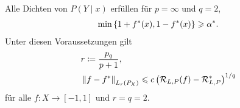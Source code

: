 \begin{bsp*}
Alle Dichten von $P(Y\mid x)$ erfüllen für $p=\infty$ und $q=2$,
\begin{align*}
\min\left\{ 1+f^*(x),1-f^*(x) \right\} \geqslant \alpha^*.
\end{align*}
Unter diesen Voraussetzungen gilt
\begin{align*}
&r \coloneq \frac{p_q}{p+1},\\
&\left\|f-f^*\right\|_{L_r(P_X)}
\leqslant c\left(\mathcal{R}_{L,P}(f)-\mathcal{R}_{L,P}^* \right)^{1/q}
\end{align*}
für alle $f: X\to [-1,1]$ und $r=q=2$.\bsphere
\end{bsp*}